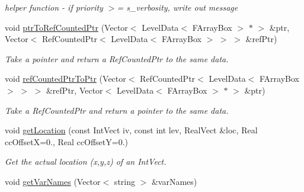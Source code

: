\begin{DoxyCompactItemize}
\begin{DoxyCompactList}\small\item\em helper function -\/ if priority $>$= s\-\_\-verbosity, write out message \end{DoxyCompactList}\item 
\hypertarget{classamr_mushy_layer_aa01cbe0216c124b1f6731b52e79a0587}{void \hyperlink{classamr_mushy_layer_aa01cbe0216c124b1f6731b52e79a0587}{ptr\-To\-Ref\-Counted\-Ptr} (Vector$<$ Level\-Data$<$ F\-Array\-Box $>$ $\ast$ $>$ \&ptr, Vector$<$ Ref\-Counted\-Ptr$<$ Level\-Data$<$ F\-Array\-Box $>$ $>$ $>$ \&ref\-Ptr)}\label{classamr_mushy_layer_aa01cbe0216c124b1f6731b52e79a0587}

\begin{DoxyCompactList}\small\item\em Take a pointer and return a Ref\-Counted\-Ptr to the same data. \end{DoxyCompactList}\item 
\hypertarget{classamr_mushy_layer_a917e8918451988372e556e8f8f4e391c}{void \hyperlink{classamr_mushy_layer_a917e8918451988372e556e8f8f4e391c}{ref\-Counted\-Ptr\-To\-Ptr} (Vector$<$ Ref\-Counted\-Ptr$<$ Level\-Data$<$ F\-Array\-Box $>$ $>$ $>$ \&ref\-Ptr, Vector$<$ Level\-Data$<$ F\-Array\-Box $>$ $\ast$ $>$ \&ptr)}\label{classamr_mushy_layer_a917e8918451988372e556e8f8f4e391c}

\begin{DoxyCompactList}\small\item\em Take a Ref\-Counted\-Ptr and return a pointer to the same data. \end{DoxyCompactList}\item 
\hypertarget{classamr_mushy_layer_acbd65aadd4ec5c022282a9633d7a6959}{void \hyperlink{classamr_mushy_layer_acbd65aadd4ec5c022282a9633d7a6959}{get\-Location} (const Int\-Vect iv, const int lev, Real\-Vect \&loc, Real cc\-Offset\-X=0., Real cc\-Offset\-Y=0.)}\label{classamr_mushy_layer_acbd65aadd4ec5c022282a9633d7a6959}

\begin{DoxyCompactList}\small\item\em Get the actual location (x,y,z) of an Int\-Vect. \end{DoxyCompactList}\item 
\hypertarget{classamr_mushy_layer_ab43481a5faeb81d3641d522599851384}{void \hyperlink{classamr_mushy_layer_ab43481a5faeb81d3641d522599851384}{get\-Var\-Names} (Vector$<$ string $>$ \&var\-Names)}\label{classamr_mushy_layer_ab43481a5faeb81d3641d522599851384}


\end{DoxyCompactItemize}
